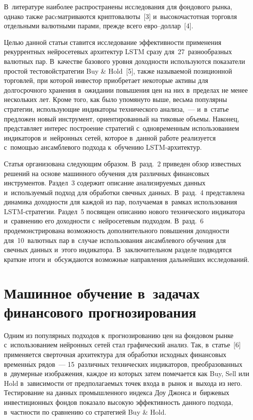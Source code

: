 {\begin{multicols}{2}
В~литературе 
наиболее распространены исследования для фондового рынка, однако также 
расcматриваются криптовалюты~[3] и~вы\-со\-ко\-час\-тот\-ная торговля отдельными валютными 
парами, прежде всего евро--дол\-лар~[4].
  
  Целью данной статьи ставится исследование эффективности применения рекуррентных 
нейросетевых архитектур LSTM сразу для~27~разнообразных валютных пар. В~качестве базового уровня до\-ход\-ности 
используются показатели простой тестовой\linebreak стратегии Buy \& Hold~[5], также на\-зы\-ва\-емой 
позиционной торговлей, при которой инвестор приобретает некоторые активы для 
долгосрочного хранения в~ожидании повышения цен на них в~\mbox{пределах} не менее нескольких 
лет. Кроме того, как было упомянуто выше, весьма популярны стратегии, использующие 
индикаторы технического анализа,~--- и~в~статье предложен новый инструмент, 
ориентированный на тиковые объемы. Наконец, представляет интерес построение стратегий 
с~одновременным использованием индикаторов и~нейронных сетей, которое в~данной работе 
реализуется с~помощью ансамблевого подхода к~обучению LSTM-ар\-хи\-тек\-тур.
  
  Статья организована следующим образом. В~разд.~2 приведен обзор известных решений 
на основе машинного обучения для различных финансовых инструментов. Раздел~3 
содержит описание анализируемых данных и~используемый подход для обработки свечных 
данных. В~разд.~4 представлена динамика доходности для каждой из пар, получаемая 
в~рамках использования LSTM-стратегии. Раздел~5 посвящен описанию нового технического 
индикатора и~сравнению его доходности с~нейросетевым подходом. В~разд.~6 
продемонстрирована возможность дополнительного повышения доходности 
для~10~валютных пар в~случае использования ансамблевого обучения для свечных данных 
и~этого индикатора. В~заключительном разделе подводятся краткие итоги и~обсуждаются 
возможные на\-прав\-ле\-ния дальнейших исследований.

\vspace*{-6pt}
  
\section{Машинное обучение в~задачах финансового прогнозирования}

\vspace*{-2pt}

  Одним из популярных подходов к~прогнозированию цен на фондовом рынке 
  с~использованием нейронных сетей стал графический анализ. Так, в~статье~[6] применяется 
сверточная архитектура для обработки исходных финансовых временн$\acute{\mbox{ы}}$х рядов~--- 
15~различных технических индикаторов, преобразованных в~двумерные изображения, 
каж\-дое из которых затем помечается как Buy, Sell или Hold в~зависимости от 
предполагаемых точек входа в~рынок и~выхода из него. Тестирование на данных 
промышленного индекса Доу Джонса и~биржевых инвестиционных фондов показало 
высокую эффективность данного подхода, в~частности по сравнению со стратегией Buy \& 
Hold.
  

\end{multicols}}
